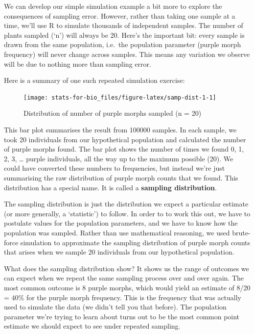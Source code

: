 \documentclass[]{book}
\begin{document}
We can develop our simple simulation example a bit more to explore the
consequences of sampling error. However, rather than taking one sample
at a time, we'll use R to simulate thousands of independent samples. The
number of plants sampled (`n') will always be 20. Here's the important
bit: every sample is drawn from the same population, i.e.~the population
parameter (purple morph frequency) will never change across samples.
This means any variation we observe will be due to nothing more than
sampling error.

Here is a summary of one such repeated simulation exercise:

\begin{figure}

{\centering \texttt{[image: stats-for-bio\_files/figure-latex/samp-dist-1-1]} 

}

\caption{Distribution of number of purple morphs sampled (n = 20)}\label{fig:samp-dist-1}
\end{figure}

This bar plot summarises the result from 100000 samples. In each sample,
we took 20 individuals from our hypothetical population and calculated
the number of purple morphs found. The bar plot shows the number of
times we found 0, 1, 2, 3, \ldots{} purple individuals, all the way up
to the maximum possible (20). We could have converted these numbers to
frequencies, but instead we're just summarising the raw distribution of
purple morph counts that we found. This distribution has a special name.
It is called a \textbf{sampling distribution}.

The sampling distribution is just the distribution we expect a
particular estimate (or more generally, a `statistic') to follow. In
order to to work this out, we have to postulate values for the
population parameters, and we have to know how the population was
sampled. Rather than use mathematical reasoning, we used brute-force
simulation to approximate the sampling distribution of purple morph
counts that arises when we sample 20 individuals from our hypothetical
population.

What does the sampling distribution show? It shows us the range of
outcomes we can expect when we repeat the same sampling process over and
over again. The most common outcome is 8 purple morphs, which would
yield an estimate of 8/20 = 40\% for the purple morph frequency. This is
the frequency that was actually used to simulate the data (we didn't
tell you that before). The population parameter we're trying to learn
about turns out to be the most common point estimate we should expect to
see under repeated sampling.
\end{document}
